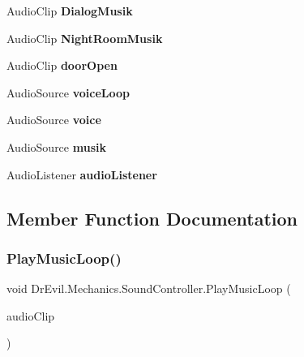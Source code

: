 \begin{DoxyCompactItemize}
Audio\+Clip {\bfseries Dialog\+Musik}
\item 
\mbox{\label{class_dr_evil_1_1_mechanics_1_1_sound_controller_af6eb6340062c658b98925b99bfa1466a}} 
Audio\+Clip {\bfseries Night\+Room\+Musik}
\item 
\mbox{\label{class_dr_evil_1_1_mechanics_1_1_sound_controller_a2956864165cb78b38eb7e0ff2b4e5f04}} 
Audio\+Clip {\bfseries door\+Open}
\item 
\mbox{\label{class_dr_evil_1_1_mechanics_1_1_sound_controller_a79cd0f9efa40784fb196b24fb2eaa003}} 
Audio\+Source {\bfseries voice\+Loop}
\item 
\mbox{\label{class_dr_evil_1_1_mechanics_1_1_sound_controller_a95db10148a9b5937e1f339851f4c43d4}} 
Audio\+Source {\bfseries voice}
\item 
\mbox{\label{class_dr_evil_1_1_mechanics_1_1_sound_controller_a1b5748afc6fd6aab242da313b54e9d1d}} 
Audio\+Source {\bfseries musik}
\item 
\mbox{\label{class_dr_evil_1_1_mechanics_1_1_sound_controller_a2da4a097ab1f46ffcaf6170baf60d072}} 
Audio\+Listener {\bfseries audio\+Listener}
\end{DoxyCompactItemize}


\subsection{Member Function Documentation}
\mbox{\label{class_dr_evil_1_1_mechanics_1_1_sound_controller_aa5c3b26d880752cbe5f46fae6bab51db}} 
\subsubsection{\texorpdfstring{Play\+Music\+Loop()}{PlayMusicLoop()}}
{\footnotesize\ttfamily void Dr\+Evil.\+Mechanics.\+Sound\+Controller.\+Play\+Music\+Loop (\begin{DoxyParamCaption}\item[{Audio\+Clip}]{audio\+Clip }\end{DoxyParamCaption})\hspace{0.3cm}{\ttfamily [inline]}}



